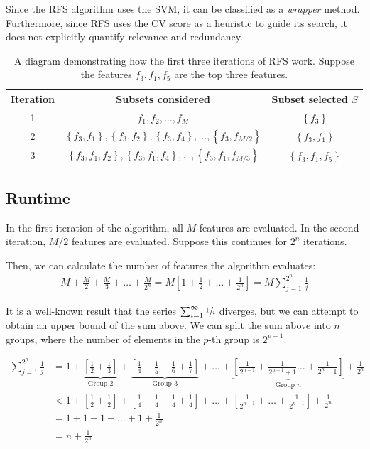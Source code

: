 \documentclass[12pt, twoside, a4paper]{report}
\begin{document}
Since the RFS algorithm uses the SVM, it can be classified as a \textit{wrapper} method. Furthermore, since RFS uses the CV score as a heuristic to guide its search, it does not explicitly quantify relevance and redundancy.


\begin{table}
\centering
    \begin{tabular}{ | c | c | c | }
    \hline
    Iteration & Subsets considered & Subset selected $S$ \\
    \hline
    1 & $f_1, f_2, \dots, f_M$ & $\left\lbrace f_3 \right\rbrace$ \\ \hline
    2 & $\left\lbrace f_3, f_1 \right\rbrace, \left\lbrace f_3, f_2 \right\rbrace, \left\lbrace f_3, f_4 \right\rbrace, \dots , \left\lbrace f_3, f_{M/2} \right\rbrace$ & $\left\lbrace f_3, f_1 \right\rbrace$ \\ \hline
    3 & $\left\lbrace f_3, f_1, f_2 \right\rbrace, \left\lbrace f_3, f_1, f_4 \right\rbrace, \dots , \left\lbrace f_3, f_1, f_{M/3} \right\rbrace$ & $\left\lbrace f_3, f_1, f_5 \right\rbrace$ \\ \hline
    \end{tabular}
\caption{A diagram demonstrating how the first three iterations of RFS work. Suppose the features $f_3, f_1, f_5$ are the top three features.}
\label{body:rfs:example}
\end{table}


\subsection{Runtime}
In the first iteration of the algorithm, all $M$ features are evaluated. In the second iteration, $M/2$ features are evaluated. Suppose this continues for $2^n$ iterations.

Then, we can calculate the number of features the algorithm evaluates:
\begin{align*}
M+\frac{M}{2}+\frac{M}{3}+\dots+\frac{M}{2^n} = M\left[ 1+\frac{1}{2}+\dots+\frac{1}{2^n} \right]=M \sum_{j=1}^{2^n} \frac{1}{j}
\end{align*}

It is a well-known result that the series $\sum_{i=1}^{\infty} \sfrac{1}{i}$ diverges, but we can attempt to obtain an upper bound of the sum above. We can split the sum above into $n$ groups, where the number of elements in the $p$-th group is $2^{p-1}$.

\begin{align*}
\sum_{j=1}^{2^n} \frac{1}{j}
&= 1 + \underbrace{\left[ \frac{1}{2} + \frac{1}{3} \right]}_{\text{Group 2}} + \underbrace{\left[ \frac{1}{4} + \frac{1}{5} + \frac{1}{6} + \frac{1}{7} \right]}_{\text{Group 3}} + \dots + \underbrace{\left[ \frac{1}{2^{n-1}} + \frac{1}{2^{n-1}+1} \dots + \frac{1}{2^{n}-1} \right]}_{\text{Group $n$}} + \frac{1}{2^n} \\
&< 1 + \left[ \frac{1}{2} + \frac{1}{2} \right] + \left[ \frac{1}{4} + \frac{1}{4} + \frac{1}{4} + \frac{1}{4} \right] + \dots + \left[ \frac{1}{2^{n-1}} + \dots + \frac{1}{2^{n-1}} \right] + \frac{1}{2^n} \\
&= 1+1+1+ \dots + 1 + \frac{1}{2^n} \\
&= n + \frac{1}{2^n}
\end{align*}
\end{document}

